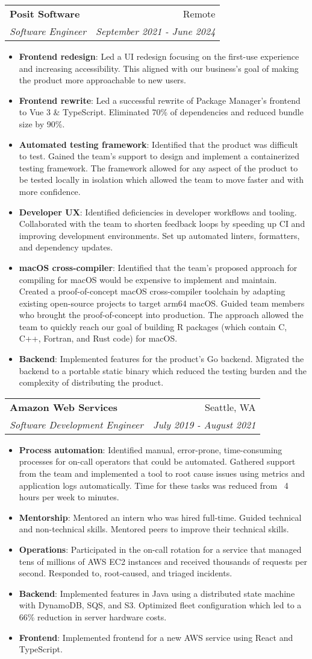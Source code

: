 \documentclass[letterpaper,11pt]{article}
\makeatletter
\newcommand{\resumeItem}[2]{
  \item\small{
    \textbf{#1}{: #2 \vspace{-2pt}}
  }
}
\newcommand{\resumeSubheading}[4]{
  \vspace{-1pt}\item
    \begin{tabular*}{0.97\textwidth}[t]{l@{\extracolsep{\fill}}r}
      \textbf{#1} & #2 \\
      \textit{\small#3} & \textit{\small #4} \\
    \end{tabular*}\vspace{-5pt}
}
\newcommand{\resumeItemListStart}{\begin{itemize}}
\newcommand{\resumeItemListEnd}{\end{itemize}\vspace{-5pt}}
\makeatother
\begin{document}
    \resumeSubheading
      {Posit Software}{Remote}
      {Software Engineer}{September 2021 - June 2024}
      \resumeItemListStart
        \resumeItem{Frontend redesign}{Led a UI redesign focusing on the first-use experience and increasing accessibility. This aligned with our business's goal of making the product more approachable to new users.}
        \resumeItem{Frontend rewrite}{Led a successful rewrite of Package Manager's frontend to Vue 3 \& TypeScript. Eliminated 70\% of dependencies and reduced bundle size by 90\%.}
        \resumeItem{Automated testing framework}{Identified that the product was difficult to test. Gained the team's support to design and implement a containerized testing framework. The framework allowed for any aspect of the product to be tested locally in isolation which allowed the team to move faster and with more confidence.}
        \resumeItem{Developer UX}{Identified deficiencies in developer workflows and tooling. Collaborated with the team to shorten feedback loops by speeding up CI and improving development environments. Set up automated linters, formatters, and dependency updates.}
        \resumeItem{macOS cross-compiler}{Identified that the team's proposed approach for compiling for macOS would be expensive to implement and maintain. Created a proof-of-concept macOS cross-compiler toolchain by adapting existing open-source projects to target arm64 macOS. Guided team members who brought the proof-of-concept into production. The approach allowed the team to quickly reach our goal of building R packages (which contain C, C++, Fortran, and Rust code) for macOS.}
        \resumeItem{Backend}{Implemented features for the product's Go backend. Migrated the backend to a portable static binary which reduced the testing burden and the complexity of distributing the product.}
      \resumeItemListEnd

    \resumeSubheading
      {Amazon Web Services}{Seattle, WA}
      {Software Development Engineer}{July 2019 - August 2021}
      \resumeItemListStart
        \resumeItem{Process automation}{Identified manual, error-prone, time-consuming processes for on-call operators that could be automated. Gathered support from the team and implemented a tool to root cause issues using metrics and application logs automatically. Time for these tasks was reduced from ~4 hours per week to minutes.}
        \resumeItem{Mentorship}{Mentored an intern who was hired full-time. Guided technical and non-technical skills. Mentored peers to improve their technical skills.}
        \resumeItem{Operations}{Participated in the on-call rotation for a service that managed tens of millions of AWS EC2 instances and received thousands of requests per second. Responded to, root-caused, and triaged incidents.}
        \resumeItem{Backend}{Implemented features in Java using a distributed state machine with DynamoDB, SQS, and S3. Optimized fleet configuration which led to a 66\% reduction in server hardware costs.}
        \resumeItem{Frontend}{Implemented frontend for a new AWS service using React and TypeScript.}
        \resumeItemListEnd
\end{document}
